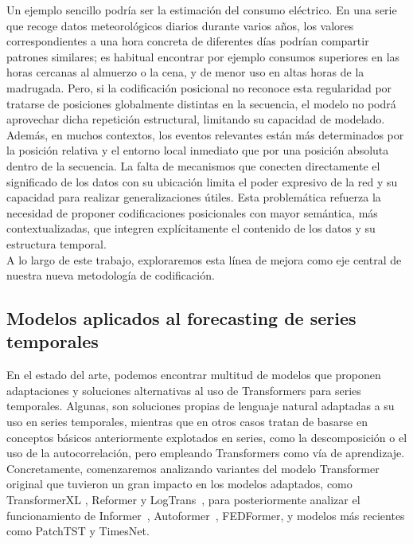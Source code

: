 Un ejemplo sencillo podría ser la estimación del consumo eléctrico. En una serie que recoge datos meteorológicos diarios durante varios años, los valores correspondientes a una hora concreta de diferentes días podrían compartir patrones similares; es habitual encontrar por ejemplo consumos superiores en las horas cercanas al almuerzo o la cena, y de menor uso en altas horas de la madrugada. Pero, si la codificación posicional no reconoce esta regularidad por tratarse de posiciones globalmente distintas en la secuencia, el modelo no podrá aprovechar dicha repetición estructural, limitando su capacidad de modelado.\\

Además, en muchos contextos, los eventos relevantes están más determinados por la posición relativa y el entorno local inmediato que por una posición absoluta dentro de la secuencia. La falta de mecanismos que conecten directamente el significado de los datos con su ubicación limita el poder expresivo de la red y su capacidad para realizar generalizaciones útiles. Esta problemática refuerza la necesidad de proponer codificaciones posicionales con mayor semántica, más contextualizadas, que integren explícitamente el contenido de los datos y su estructura temporal.\\

A lo largo de este trabajo, exploraremos esta línea de mejora como eje central de nuestra nueva metodología de codificación.


\subsection{Modelos aplicados al forecasting de series temporales}

En el estado del arte, podemos encontrar multitud de modelos que proponen adaptaciones y soluciones alternativas al uso de Transformers para series temporales. Algunas, son soluciones propias de lenguaje natural adaptadas a su uso en series temporales, mientras que en otros casos tratan de basarse en conceptos básicos anteriormente explotados en series, como la descomposición o el uso de la autocorrelación, pero empleando Transformers como vía de aprendizaje.\\

Concretamente, comenzaremos analizando variantes del modelo Transformer original que tuvieron un gran impacto en los modelos adaptados, como TransformerXL \cite{dai2019transformerxlattentivelanguagemodels}, Reformer \cite{kitaev2020reformerefficienttransformer} y LogTrans~\cite{NEURIPS2019_6775a063}, para posteriormente analizar el funcionamiento de Informer~\cite{zhou2021informerefficienttransformerlong}, Autoformer~\cite{wu2022autoformerdecompositiontransformersautocorrelation}, FEDFormer, y modelos más recientes como PatchTST y TimesNet.

